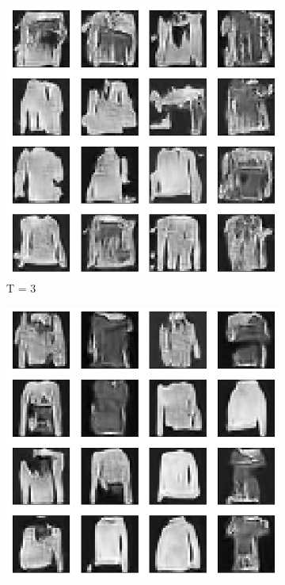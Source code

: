 \documentclass{article}
\begin{document}
\begin{figure}[H]
	\begin{subfigure}[h]{0.3\linewidth}
		\centering
		\includegraphics[scale=0.3]{../code/figures/generated_DDGAN_3.png}
		\caption{T = 3}
	\end{subfigure}
	\hfill
	\begin{subfigure}[h]{0.3\linewidth}
		\centering
		\includegraphics[scale=0.3]{../code/figures/generated_DDGAN_5.png}

\end{subfigure}
\end{figure}
\end{document}
